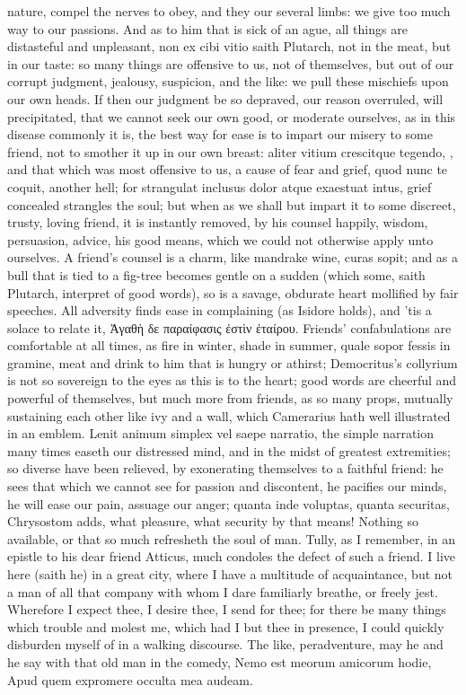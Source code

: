 {nature, compel the nerves to obey, and they our several limbs: we give
too much way to our passions. And as to him that is sick of an ague,
all things are distasteful and unpleasant, non ex cibi vitio saith
Plutarch, not in the meat, but in our taste: so many things are
offensive to us, not of themselves, but out of our corrupt judgment,
jealousy, suspicion, and the like: we pull these mischiefs upon our own
heads.
If then our judgment be so depraved, our reason overruled, will
precipitated, that we cannot seek our own good, or moderate ourselves,
as in this disease commonly it is, the best way for ease is to impart
our misery to some friend, not to smother it up in our own breast:
aliter vitium crescitque tegendo, \etc{}, and that which was most
offensive to us, a cause of fear and grief, quod nunc te coquit,
another hell; for  strangulat inclusus dolor atque exaestuat
intus, grief concealed strangles the soul; but when as we shall but
impart it to some discreet, trusty, loving friend, it is
instantly removed, by his counsel happily, wisdom, persuasion,
advice, his good means, which we could not otherwise apply unto
ourselves. A friend's counsel is a charm, like mandrake wine, curas
sopit; and as a bull that is tied to a fig-tree becomes gentle on
a sudden (which some, saith Plutarch, interpret of good words),
so is a savage, obdurate heart mollified by fair speeches. All
adversity finds ease in complaining (as Isidore holds), and 'tis
a solace to relate it, \textgreek{Ἀγαθὴ δε παραίφασις ἐστὶν ἐταίρου}.
Friends' confabulations are comfortable at all times, as fire in
winter, shade in summer, quale sopor fessis in gramine, meat and drink
to him that is hungry or athirst; Democritus's collyrium is not so
sovereign to the eyes as this is to the heart; good words are cheerful
and powerful of themselves, but much more from friends, as so many
props, mutually sustaining each other like ivy and a wall, which
Camerarius hath well illustrated in an emblem. Lenit animum simplex vel
saepe narratio, the simple narration many times easeth our distressed
mind, and in the midst of greatest extremities; so diverse have been
relieved, by exonerating themselves to a faithful friend: he sees
that which we cannot see for passion and discontent, he pacifies our
minds, he will ease our pain, assuage our anger; quanta inde voluptas,
quanta securitas, Chrysostom adds, what pleasure, what security by that
means! Nothing so available, or that so much refresheth the soul
of man. Tully, as I remember, in an epistle to his dear friend Atticus,
much condoles the defect of such a friend. I live here (saith he)
in a great city, where I have a multitude of acquaintance, but not a
man of all that company with whom I dare familiarly breathe, or freely
jest. Wherefore I expect thee, I desire thee, I send for thee; for
there be many things which trouble and molest me, which had I but thee
in presence, I could quickly disburden myself of in a walking
discourse. The like, peradventure, may he and he say with that old man
in the comedy,
Nemo est meorum amicorum hodie,
Apud quem expromere occulta mea audeam.

}
